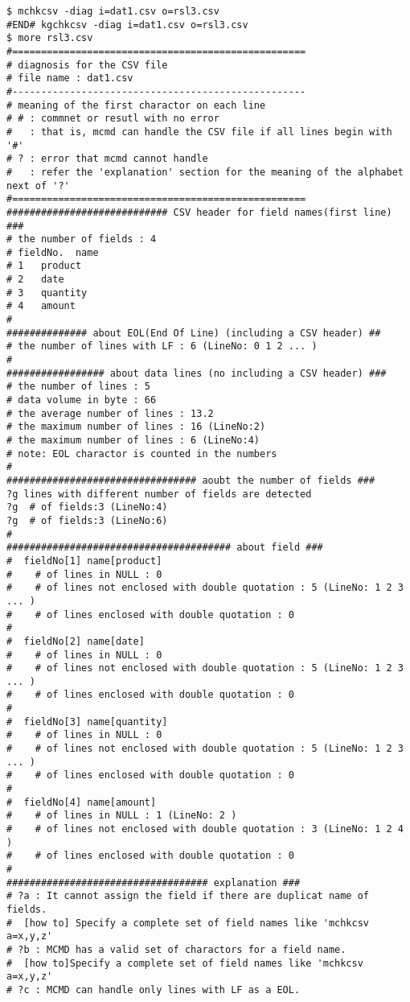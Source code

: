 \begin{Verbatim}[baselinestretch=0.7,frame=single]
$ mchkcsv -diag i=dat1.csv o=rsl3.csv
#END# kgchkcsv -diag i=dat1.csv o=rsl3.csv
$ more rsl3.csv
#===================================================
# diagnosis for the CSV file 
# file name : dat1.csv
#---------------------------------------------------
# meaning of the first charactor on each line
# # : commnet or resutl with no error
#   : that is, mcmd can handle the CSV file if all lines begin with '#'
# ? : error that mcmd cannot handle
#   : refer the 'explanation' section for the meaning of the alphabet next of '?'
#===================================================
############################ CSV header for field names(first line) ###
# the number of fields : 4
# fieldNo.  name
# 1   product
# 2   date
# 3   quantity
# 4   amount
#
############## about EOL(End Of Line) (including a CSV header) ##
# the number of lines with LF : 6 (LineNo: 0 1 2 ... )
#
################# about data lines (no including a CSV header) ###
# the number of lines : 5
# data volume in byte : 66
# the average number of lines : 13.2
# the maximum number of lines : 16 (LineNo:2)
# the maximum number of lines : 6 (LineNo:4)
# note: EOL charactor is counted in the numbers
#
################################# aoubt the number of fields ###
?g lines with different number of fields are detected
?g  # of fields:3 (LineNo:4)
?g  # of fields:3 (LineNo:6)
#
####################################### about field ###
#  fieldNo[1] name[product]
#    # of lines in NULL : 0 
#    # of lines not enclosed with double quotation : 5 (LineNo: 1 2 3 ... )
#    # of lines enclosed with double quotation : 0 
#
#  fieldNo[2] name[date]
#    # of lines in NULL : 0 
#    # of lines not enclosed with double quotation : 5 (LineNo: 1 2 3 ... )
#    # of lines enclosed with double quotation : 0 
#
#  fieldNo[3] name[quantity]
#    # of lines in NULL : 0 
#    # of lines not enclosed with double quotation : 5 (LineNo: 1 2 3 ... )
#    # of lines enclosed with double quotation : 0 
#
#  fieldNo[4] name[amount]
#    # of lines in NULL : 1 (LineNo: 2 )
#    # of lines not enclosed with double quotation : 3 (LineNo: 1 2 4 )
#    # of lines enclosed with double quotation : 0 
#
################################### explanation ###
# ?a : It cannot assign the field if there are duplicat name of fields.
#  [how to] Specify a complete set of field names like 'mchkcsv a=x,y,z'
# ?b : MCMD has a valid set of charactors for a field name.
#  [how to]Specify a complete set of field names like 'mchkcsv a=x,y,z'
# ?c : MCMD can handle only lines with LF as a EOL.

\end{Verbatim}
